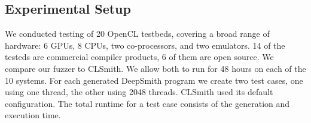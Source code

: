 \subsection{Experimental Setup}

We conducted testing of 20 OpenCL testbeds, covering a broad range of hardware: 6 GPUs, 8 CPUs, two co-processors, and two emulators. 14 of the testeds are commercial compiler products, 6 of them are open source. We compare our fuzzer to CLSmith. We allow both to run for 48 hours on each of the 10 systems. For each generated DeepSmith program we create two test cases, one using one thread, the other using 2048 threads. CLSmith used its default configuration. The total runtime for a test case consists of the generation and execution time.
